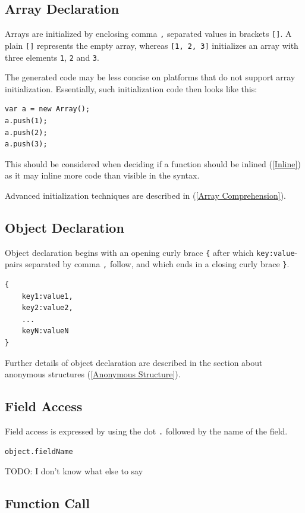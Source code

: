 \documentclass{article}
\newcommand{\expr}[1]{\texttt{#1}}
\newcommand{\fullref}[1]{\nameref{#1} (\cref{#1})}
\newcommand{\todo}[1]{TODO: #1}
\begin{document}
\subsection{Array Declaration}
\label{Array Declaration}

Arrays are initialized by enclosing comma \expr{,} separated values in brackets \expr{[]}. A plain \expr{[]} represents the empty array, whereas \expr{[1, 2, 3]} initializes an array with three elements \expr{1}, \expr{2} and \expr{3}.

The generated code may be less concise on platforms that do not support array initialization. Essentially, such initialization code then looks like this:

\begin{lstlisting}
var a = new Array();
a.push(1);
a.push(2);
a.push(3);
\end{lstlisting}
This should be considered when deciding if a function should be inlined (\cref{Inline}) as it may inline more code than visible in the syntax.

Advanced initialization techniques are described in \fullref{Array Comprehension}.


\subsection{Object Declaration}
\label{Object Declaration}

Object declaration begins with an opening curly brace \expr{\{} after which \expr{key:value}-pairs separated by comma \expr{,} follow, and which ends in a closing curly brace \expr{\}}.

\begin{lstlisting}
{
	key1:value1,
	key2:value2,
	...
	keyN:valueN
}
\end{lstlisting}
Further details of object declaration are described in the section about anonymous structures (\cref{Anonymous Structure}).


\subsection{Field Access}

Field access is expressed by using the dot \expr{.} followed by the name of the field.

\begin{lstlisting}
object.fieldName
\end{lstlisting}
\todo{I don't know what else to say}


\subsection{Function Call}
\end{document}
